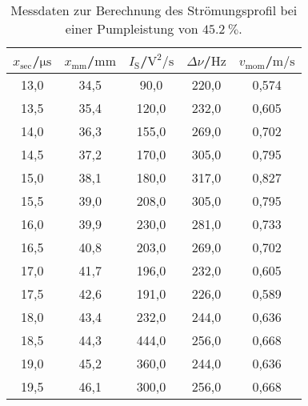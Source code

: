 \begin{table}
  \centering
  \caption{Messdaten zur Berechnung des Strömungsprofil bei einer Pumpleistung von $\SI{45.2}{\percent}$.}
  \label{tab:pl45}
  \begin{tabular}{ccccc}
    \toprule
    $x_\mathrm{sec}$/$\si{\micro\second}$ & $x_\mathrm{mm}$/$\si{\milli\meter}$ & $I_\mathrm{S}$/$\si{\square\volt\per\second}$ & $\Delta \nu$/$\si{\Hz}$&$v_\mathrm{mom}$/$\si{\meter\per\second}$ \\
    \midrule
    13,0 & 34,5 & 90,0 & 220,0 & 0,574 \\
    13,5 & 35,4 & 120,0 & 232,0 & 0,605 \\
    14,0 & 36,3 & 155,0 & 269,0 & 0,702 \\
    14,5 & 37,2 & 170,0 & 305,0 & 0,795 \\
    15,0 & 38,1 & 180,0 & 317,0 & 0,827 \\
    15,5 & 39,0 & 208,0 & 305,0 & 0,795 \\
    16,0 & 39,9 & 230,0 & 281,0 & 0,733 \\
    16,5 & 40,8 & 203,0 & 269,0 & 0,702 \\
    17,0 & 41,7 & 196,0 & 232,0 & 0,605 \\
    17,5 & 42,6 & 191,0 & 226,0 & 0,589 \\
    18,0 & 43,4 & 232,0 & 244,0 & 0,636 \\
    18,5 & 44,3 & 444,0 & 256,0 & 0,668 \\
    19,0 & 45,2 & 360,0 & 244,0 & 0,636 \\
    19,5 & 46,1 & 300,0 & 256,0 & 0,668 \\
    \bottomrule
  \end{tabular}
\end{table}
